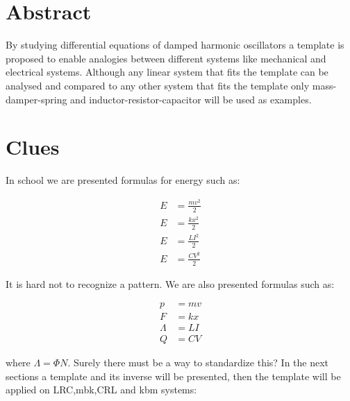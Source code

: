 
\section{Abstract}

By studying differential equations of damped harmonic oscillators a template is proposed to enable analogies between different systems like mechanical and electrical systems.
Although any linear system that fits the template can be analysed and compared to any other system that fits the template only mass-damper-spring and inductor-resistor-capacitor will be used as examples.

\section{Clues}

In school we are presented formulas for energy such as:

\begin{align}
E &= \frac{m v^2}{2} \tag{kinetic energy} \\
E &= \frac{k x^2}{2} \tag{spring energy} \\
E &= \frac{L I^2}{2} \tag{inductor energy} \\
E &= \frac{C V^2}{2} \tag{capacitor energy}
\end{align}

It is hard not to recognize a pattern.
We are also presented formulas such as:

\begin{align}
p &= m v \tag{momentum} \\
F &= k x \tag{spring force} \\
\Lambda &= L I \tag{inductance} \\
Q &= C V \tag{capacitance}
\end{align}

where $\Lambda = \Phi N$.
Surely there must be a way to standardize this? 
In the next sections a template and its inverse will be presented, then the template will be applied on LRC,mbk,CRL and kbm systems:


